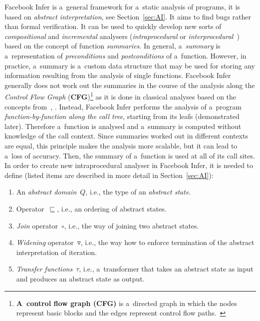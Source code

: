 Facebook Infer is a~general framework for a~static analysis of programs, it is
based on \emph{abstract interpretation}, see Section~\ref{sec:AI}. It aims 
to find bugs rather than formal verification. It can be used to quickly develop
new sorts of \emph{compositional} and \emph{incremental} analysers 
(\emph{intraprocedural} or 
\emph{interprocedural}~\cite{programAnalysisNielson}) based
on the concept of function \emph{summaries}. In general, a~\emph{summary}
is a~representation of \emph{preconditions} and \emph{postconditions} of 
a~function. However, in practice, a~summary is a~custom data structure that 
may be used for storing any information resulting from the analysis of 
single functions. Facebook Infer generally does not work out the summaries
in the course of the analysis along the \emph{Control Flow Graph}
(\textbf{CFG})\footnote{\textbf{A~control flow graph (CFG)} is a~directed 
graph in which the nodes represent basic blocks and the edges represent control flow paths.~\cite{controlFlowAnalysisAllen}} as it is done in classical analyses
based on the concepts from~\cite{dataflowAnalysisGraphReachability},
\cite{dataflowAnalysisApproaches}. Instead, Facebook Infer performs the
analysis of a~program \emph{function-by-function along the call tree},
starting from its leafs (demonstrated later). Therefore a~function
is analysed and a~summary is computed without knowledge of the
call context. Since summaries worked out in different contexts are equal,
this principle makes the analysis more scalable, but it can lead to
a~loss of accuracy. Then, the summary of a~function is used at all of its
call sites. In order to create new intraprocedural analyser in Facebook 
Infer, it is needed to define (listed items are described in more detail
in Section~\ref{sec:AI}):
\begin{enumerate}
    \item 
        An \emph{abstract domain}~$ Q $, i.e., the type of an 
        \emph{abstract state}.
        
    \item
        Operator~$ \sqsubseteq $, i.e., an ordering of abstract states.
        
    \item
        \emph{Join} operator~$ \circ $, i.e., the way of joining two abstract
        states.
        
    \item
        \emph{Widening} operator~$ \triangledown $, i.e., the way how to 
        enforce termination of the abstract interpretation of iteration.
        
    \item
        \emph{Transfer functions}~$ \tau $, i.e., a~transformer that
        takes an abstract state as input and produces an abstract state
        as output.
\end{enumerate}
